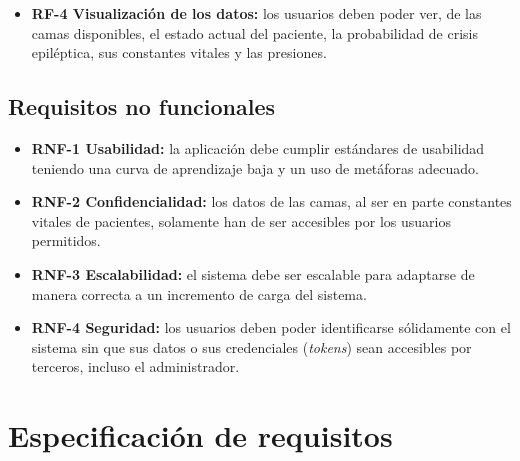 \begin{itemize}
	\item \textbf{RF-4 Visualización de los datos:} los usuarios deben poder ver, de las camas disponibles, el estado actual del paciente, la probabilidad de crisis epiléptica, sus constantes vitales y las presiones. 
	
\end{itemize}

\subsection{Requisitos no funcionales}

\begin{itemize}
	\item \textbf{RNF-1 Usabilidad:} la aplicación debe cumplir estándares de usabilidad teniendo una curva de aprendizaje baja y un uso de metáforas adecuado.
	\item \textbf{RNF-2 Confidencialidad:} los datos de las camas, al ser en parte constantes vitales de pacientes, solamente han de ser accesibles por los usuarios permitidos.
	\item \textbf{RNF-3 Escalabilidad:} el sistema debe ser escalable para adaptarse de manera correcta a un incremento de carga del sistema.
	\item \textbf{RNF-4 Seguridad:} los usuarios deben poder identificarse sólidamente con el sistema sin que sus datos o sus credenciales (\textit{tokens}) sean accesibles por terceros, incluso el administrador.
\end{itemize}


\section{Especificación de requisitos}





